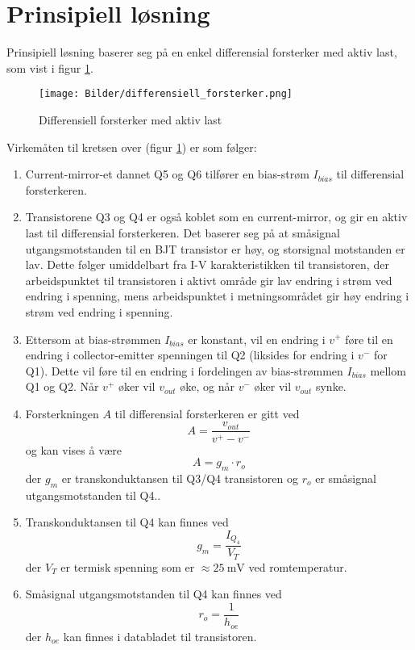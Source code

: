\section{Prinsipiell løsning}
\label{prinsipiellLoesning}

Prinsipiell løsning baserer seg på en enkel differensial forsterker med aktiv last,
som vist i figur \ref{fig:differensiell_forsterker}.

\begin{figure}[H]
    \centering
    \texttt{[image: Bilder/differensiell\_forsterker.png]}
    \caption{Differensiell forsterker med aktiv last}
    \label{fig:differensiell_forsterker}
\end{figure}

Virkemåten til kretsen over (figur \ref{fig:differensiell_forsterker}) er som følger:
\begin{enumerate}
    \item Current-mirror-et dannet Q5 og Q6 tilfører en bias-strøm $I_{bias}$ til differensial forsterkeren.
    \item Transistorene Q3 og Q4 er også koblet som en current-mirror, og gir en aktiv last til differensial forsterkeren.
        Det baserer seg på at småsignal utgangsmotstanden til en BJT transistor er høy, og storsignal motstanden er lav. Dette følger 
        umiddelbart fra I-V karakteristikken til transistoren, der arbeidspunktet til transistoren i aktivt område gir 
        lav endring i strøm ved endring i spenning, mens arbeidspunktet i metningsområdet gir høy endring i strøm ved endring i spenning.
    \item Ettersom at bias-strømmen $I_{bias}$ er konstant, vil en endring i $v^+$ føre til en endring i collector-emitter spenningen til Q2 (liksides for endring i $v^-$ for Q1).
        Dette vil føre til en endring i fordelingen av bias-strømmen $I_{bias}$ mellom Q1 og Q2. Når $v^+$ øker vil $v_{out}$ øke, og
        når $v^-$ øker vil $v_{out}$ synke.
    \item Forsterkningen $A$ til differensial forsterkeren er gitt ved
        \[
            A = \frac{v_{out}}{v^+ - v^-}
        \]
        og kan vises å være
        \[
            A = g_m \cdot r_o
        \]
        der $g_m$ er transkonduktansen til Q3/Q4 transistoren og $r_o$ er småsignal utgangsmotstanden til Q4..
    \item Transkonduktansen til Q4 kan finnes ved
        \[
            g_m = \frac{I_{Q_4}}{V_T}
        \]
        der $V_T$ er termisk spenning som er $\approx \SI{25}{\milli\volt}$ ved romtemperatur.
    \item Småsignal utgangsmotstanden til Q4 kan finnes ved
        \[
            r_o = \frac{1}{h_{oe}}
        \]
        der $h_{oe}$ kan finnes i databladet til transistoren.
\end{enumerate}

